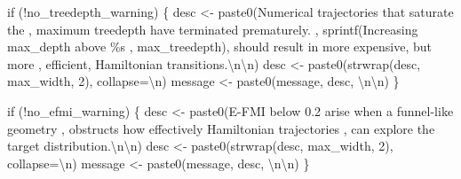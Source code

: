 \documentclass[
  letterpaper,
  DIV=11,
  numbers=noendperiod]{scrartcl}
\newenvironment{Shaded}{\begin{snugshade}}{\end{snugshade}}
\newcommand{\CharTok}[1]{\textcolor[rgb]{0.13,0.47,0.30}{#1}}
\newcommand{\ControlFlowTok}[1]{\textcolor[rgb]{0.00,0.23,0.31}{#1}}
\newcommand{\DecValTok}[1]{\textcolor[rgb]{0.68,0.00,0.00}{#1}}
\newcommand{\NormalTok}[1]{\textcolor[rgb]{0.00,0.23,0.31}{#1}}
\newcommand{\OperatorTok}[1]{\textcolor[rgb]{0.37,0.37,0.37}{#1}}
\newcommand{\SpecialCharTok}[1]{\textcolor[rgb]{0.37,0.37,0.37}{#1}}
\newcommand{\StringTok}[1]{\textcolor[rgb]{0.13,0.47,0.30}{#1}}
\begin{document}
\begin{Shaded}
\begin{Highlighting}[]
  \ControlFlowTok{if}\NormalTok{ (}\OperatorTok{!}\NormalTok{no\_treedepth\_warning) \{}
\NormalTok{    desc }\OperatorTok{\textless{}{-}}\NormalTok{ paste0(}\StringTok{\textquotesingle{}Numerical trajectories that saturate the \textquotesingle{}}\NormalTok{,}
                   \StringTok{\textquotesingle{}maximum treedepth have terminated prematurely.  \textquotesingle{}}\NormalTok{,}
\NormalTok{                   sprintf(}\StringTok{\textquotesingle{}Increasing max\_depth above }\SpecialCharTok{\%s}\StringTok{ \textquotesingle{}}\NormalTok{, max\_treedepth),}
                   \StringTok{\textquotesingle{}should result in more expensive, but more \textquotesingle{}}\NormalTok{,}
                   \StringTok{\textquotesingle{}efficient, Hamiltonian transitions.}\CharTok{\textbackslash{}n\textbackslash{}n}\StringTok{\textquotesingle{}}\NormalTok{)}
\NormalTok{    desc }\OperatorTok{\textless{}{-}}\NormalTok{ paste0(strwrap(desc, max\_width, }\DecValTok{2}\NormalTok{), collapse}\OperatorTok{=}\StringTok{\textquotesingle{}}\CharTok{\textbackslash{}n}\StringTok{\textquotesingle{}}\NormalTok{)}
\NormalTok{    message }\OperatorTok{\textless{}{-}}\NormalTok{ paste0(message, desc, }\StringTok{\textquotesingle{}}\CharTok{\textbackslash{}n\textbackslash{}n}\StringTok{\textquotesingle{}}\NormalTok{)}
\NormalTok{  \}}

  \ControlFlowTok{if}\NormalTok{ (}\OperatorTok{!}\NormalTok{no\_efmi\_warning) \{}
\NormalTok{    desc }\OperatorTok{\textless{}{-}}\NormalTok{ paste0(}\StringTok{\textquotesingle{}E{-}FMI below 0.2 arise when a funnel{-}like geometry \textquotesingle{}}\NormalTok{,}
                   \StringTok{\textquotesingle{}obstructs how effectively Hamiltonian trajectories \textquotesingle{}}\NormalTok{,}
                   \StringTok{\textquotesingle{}can explore the target distribution.}\CharTok{\textbackslash{}n\textbackslash{}n}\StringTok{\textquotesingle{}}\NormalTok{)}
\NormalTok{    desc }\OperatorTok{\textless{}{-}}\NormalTok{ paste0(strwrap(desc, max\_width, }\DecValTok{2}\NormalTok{), collapse}\OperatorTok{=}\StringTok{\textquotesingle{}}\CharTok{\textbackslash{}n}\StringTok{\textquotesingle{}}\NormalTok{)}
\NormalTok{    message }\OperatorTok{\textless{}{-}}\NormalTok{ paste0(message, desc, }\StringTok{\textquotesingle{}}\CharTok{\textbackslash{}n\textbackslash{}n}\StringTok{\textquotesingle{}}\NormalTok{)}
\NormalTok{  \}}


\end{Highlighting}
\end{Shaded}
\end{document}
